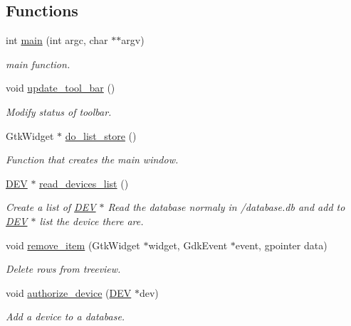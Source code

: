 \subsection*{Functions}
\begin{DoxyCompactItemize}
\item 
int \hyperlink{usb-gui_8h_a3c04138a5bfe5d72780bb7e82a18e627}{main} (int argc, char $\ast$$\ast$argv)
\begin{DoxyCompactList}\small\item\em main function. \item\end{DoxyCompactList}\item 
void \hyperlink{usb-gui_8h_a3893dfbb92994b551fb34e396c26f5d1}{update\_\-tool\_\-bar} ()
\begin{DoxyCompactList}\small\item\em Modify status of toolbar. \item\end{DoxyCompactList}\item 
GtkWidget $\ast$ \hyperlink{usb-gui_8h_a844df29073de408040bde1e4eea3f474}{do\_\-list\_\-store} ()
\begin{DoxyCompactList}\small\item\em Function that creates the main window. \item\end{DoxyCompactList}\item 
\hyperlink{structDEV}{DEV} $\ast$ \hyperlink{usb-gui_8h_a1b365986807e777a4e3da379042f731b}{read\_\-devices\_\-list} ()
\begin{DoxyCompactList}\small\item\em Create a list of \hyperlink{structDEV}{DEV} $\ast$ Read the database normaly in /database.db and add to \hyperlink{structDEV}{DEV} $\ast$ list the device there are. \item\end{DoxyCompactList}\item 
void \hyperlink{usb-gui_8h_adebdd69140dd995853b3d4a40de3c058}{remove\_\-item} (GtkWidget $\ast$widget, GdkEvent $\ast$event, gpointer data)
\begin{DoxyCompactList}\small\item\em Delete rows from treeview. \item\end{DoxyCompactList}\item 
void \hyperlink{usb-gui_8h_a36cb198a8cc3b38c2ee2cd9f50b97d67}{authorize\_\-device} (\hyperlink{structDEV}{DEV} $\ast$dev)
\begin{DoxyCompactList}\small\item\em Add a device to a database. \item\end{DoxyCompactList}\item 
$$
\end{DoxyCompactItemize}

